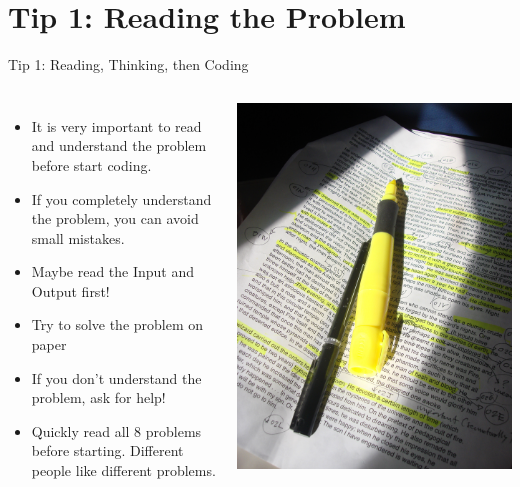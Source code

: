 \section{Tip 1: Reading the Problem}
\begin{frame}{Tip 1: Reading, Thinking, then Coding}

  \begin{columns}
    \begin{itemize}
    \item It is very important to \alert{read and understand the problem} before start coding.

    \item If you completely understand the problem, you can avoid small mistakes.
    
    \item Maybe read the \alert{Input and Output} first!

    \item Try to solve the problem \alert{on paper}

    \item If you don't understand the problem, ask for help!
    
    \item Quickly read all 8 problems before starting. Different people like different problems.
    \end{itemize}
    \includegraphics[width=\textwidth]{../img/textmarker}
  \end{columns}


\end{frame}
